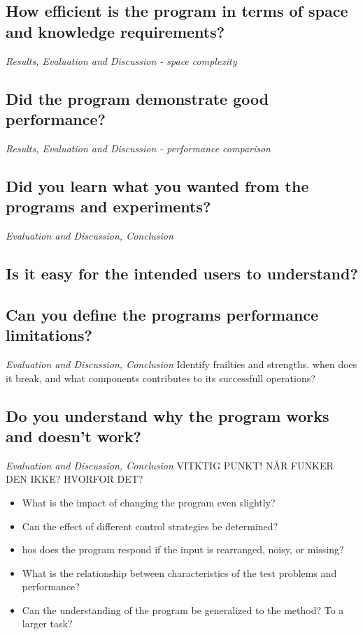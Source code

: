 \subsection{How efficient is the program in terms of space and knowledge requirements?}
\emph{\color{orange} Results, Evaluation and Discussion - space complexity}
\subsection{Did the program demonstrate good performance?}
\emph{\color{orange} Results, Evaluation and Discussion - performance comparison}
\subsection{Did you learn what you wanted from the programs and experiments?}
\emph{\color{orange} Evaluation and Discussion, Conclusion}
\subsection{Is it easy for the intended users to understand?}
\subsection{Can you define the programs performance limitations?}
\emph{\color{orange} Evaluation and Discussion, Conclusion}
Identify frailties and strengths. when does it break, and what components contributes to its successfull operations?
\subsection{Do you understand why the program works and doesn't work?}
\emph{\color{orange} Evaluation and Discussion, Conclusion}
VITKTIG PUNKT! NÅR FUNKER DEN IKKE? HVORFOR DET? 
\begin{itemize}
\item What is the impact of changing the program even slightly?
\item Can the effect of different control strategies be determined?
\item hos does the program respond if the input is rearranged, noisy, or missing?
\item What is the relationship between characteristics of the test problems and performance?
\item Can the understanding of the program be generalized to the method? To a larger task?
\end{itemize}


